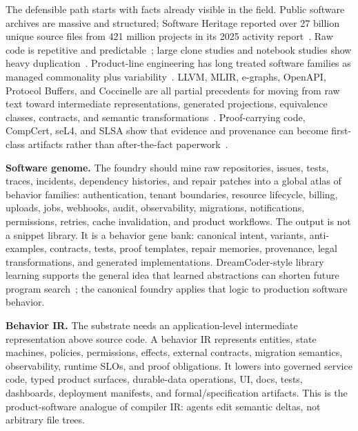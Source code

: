 The defensible path starts with facts already visible in the field. Public software archives are massive and structured; Software Heritage reported over 27 billion unique source files from 421 million projects in its 2025 activity report~\cite{softwareHeritage2025}. Raw code is repetitive and predictable~\cite{hindleNaturalness}; large clone studies and notebook studies show heavy duplication~\cite{dejavu2017,jupyterClones2020}. Product-line engineering has long treated software families as managed commonality plus variability~\cite{clementsProductLines}. LLVM, MLIR, e-graphs, OpenAPI, Protocol Buffers, and Coccinelle are all partial precedents for moving from raw text toward intermediate representations, generated projections, equivalence classes, contracts, and semantic transformations~\cite{lattnerLLVM,lattnerMLIR,eggEgraphs,openapi31,protobufOverview,coccinelle}. Proof-carrying code, CompCert, seL4, and SLSA show that evidence and provenance can become first-class artifacts rather than after-the-fact paperwork~\cite{proofCarryingCode,compcertManual,sel4Proofs,slsa}.

\textbf{Software genome.} The foundry should mine raw repositories, issues, tests, traces, incidents, dependency histories, and repair patches into a global atlas of behavior families: authentication, tenant boundaries, resource lifecycle, billing, uploads, jobs, webhooks, audit, observability, migrations, notifications, permissions, retries, cache invalidation, and product workflows. The output is not a snippet library. It is a behavior gene bank: canonical intent, variants, anti-examples, contracts, tests, proof templates, repair memories, provenance, legal transformations, and generated implementations. DreamCoder-style library learning supports the general idea that learned abstractions can shorten future program search~\cite{dreamcoder}; the canonical foundry applies that logic to production software behavior.

\textbf{Behavior IR.} The substrate needs an application-level intermediate representation above source code. A behavior IR represents entities, state machines, policies, permissions, effects, external contracts, migration semantics, observability, runtime SLOs, and proof obligations. It lowers into governed service code, typed product surfaces, durable-data operations, UI, docs, tests, dashboards, deployment manifests, and formal/specification artifacts. This is the product-software analogue of compiler IR: agents edit semantic deltas, not arbitrary file trees.

